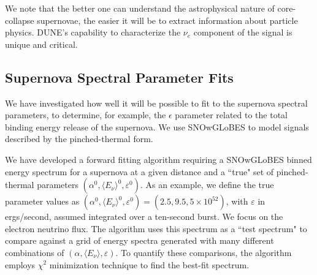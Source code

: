 We note that the better one can understand the astrophysical nature of core-collapse supernovae, the easier it will be to extract information about particle physics.  DUNE's capability to characterize the $\nu_e$ component of the signal is unique and critical.

\subsection{Supernova Spectral Parameter Fits}


We have investigated how well it will be possible to fit to the supernova
spectral parameters, to determine, for example, the $\epsilon$
parameter related to the total binding energy release of the supernova.  We 
use SNOwGLoBES to model signals described by the pinched-thermal form.

We have developed a
forward fitting algorithm requiring a SNOwGLoBES binned energy
spectrum for a supernova at a given distance and a ``true" set of
pinched-thermal parameters $(\alpha^0, \langle E_\nu \rangle^0,
\varepsilon^0)$. As an example, we define the true parameter values as
$(\alpha^0, \langle E_\nu \rangle^0, \varepsilon^0) = (2.5, 9.5,
5\times 10^{52})$, with $\varepsilon$ in ergs/second, assumed
integrated over a ten-second burst.
We focus on the electron neutrino flux. The algorithm uses this
spectrum as a ``test spectrum" to compare against a grid of energy
spectra generated with many different combinations of $(\alpha,
\langle E_\nu \rangle, \varepsilon)$. To quantify these comparisons,
the algorithm employs $\chi^2$ minimization technique to find the
best-fit spectrum.





